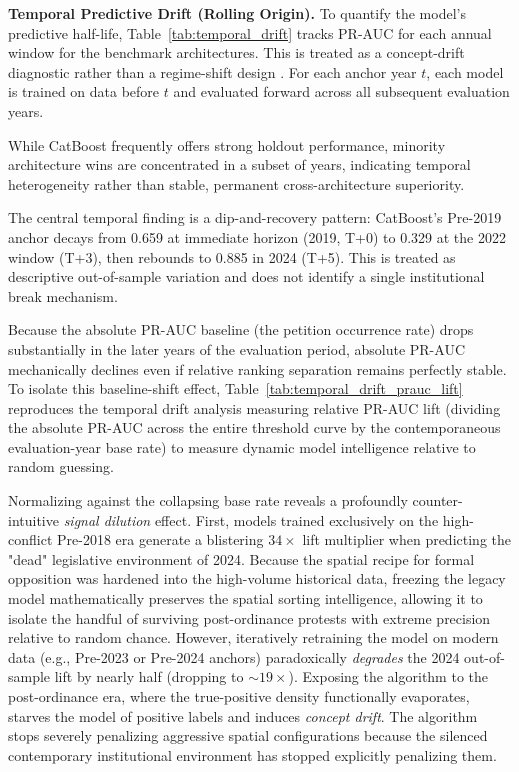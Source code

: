 \documentclass[11pt, letterpaper, oneside]{article}
\begin{document}


\vspace{1em}
\textbf{Temporal Predictive Drift (Rolling Origin).} To quantify the model's predictive half-life, Table~\ref{tab:temporal_drift} tracks PR-AUC for each annual window for the benchmark architectures. This is treated as a concept-drift diagnostic rather than a regime-shift design \cite{gama2014conceptdrift}. For each anchor year $t$, each model is trained on data before $t$ and evaluated forward across all subsequent evaluation years.

While CatBoost frequently offers strong holdout performance, minority architecture wins are concentrated in a subset of years, indicating temporal heterogeneity rather than stable, permanent cross-architecture superiority.

The central temporal finding is a dip-and-recovery pattern: CatBoost's Pre-2019 anchor decays from 0.659 at immediate horizon (2019, T+0) to 0.329 at the 2022 window (T+3), then rebounds to 0.885 in 2024 (T+5). This is treated as descriptive out-of-sample variation and does not identify a single institutional break mechanism.

\vspace{1em}


\noindent Because the absolute PR-AUC baseline (the petition occurrence rate) drops substantially in the later years of the evaluation period, absolute PR-AUC mechanically declines even if relative ranking separation remains perfectly stable. To isolate this baseline-shift effect, Table~\ref{tab:temporal_drift_prauc_lift} reproduces the temporal drift analysis measuring relative PR-AUC lift (dividing the absolute PR-AUC across the entire threshold curve by the contemporaneous evaluation-year base rate) to measure dynamic model intelligence relative to random guessing.



Normalizing against the collapsing base rate reveals a profoundly counter-intuitive \textit{signal dilution} effect. First, models trained exclusively on the high-conflict Pre-2018 era generate a blistering $34\times$ lift multiplier when predicting the "dead" legislative environment of 2024. Because the spatial recipe for formal opposition was hardened into the high-volume historical data, freezing the legacy model mathematically preserves the spatial sorting intelligence, allowing it to isolate the handful of surviving post-ordinance protests with extreme precision relative to random chance. However, iteratively retraining the model on modern data (e.g., Pre-2023 or Pre-2024 anchors) paradoxically \textit{degrades} the 2024 out-of-sample lift by nearly half (dropping to $\sim 19\times$). Exposing the algorithm to the post-ordinance era, where the true-positive density functionally evaporates, starves the model of positive labels and induces \textit{concept drift}. The algorithm stops severely penalizing aggressive spatial configurations because the silenced contemporary institutional environment has stopped explicitly penalizing them.
\end{document}
